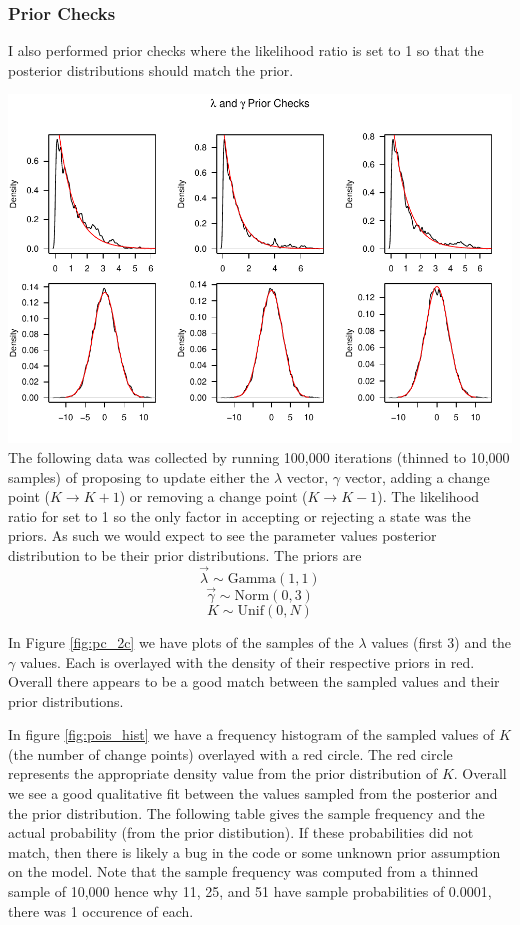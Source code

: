 \documentclass[11pt,a4paper]{article}
\numberwithin{equation}{section}
\begin{document}
\hypertarget{prior-checks-1}{%
\subsubsection{Prior Checks}\label{prior-checks-1}}

I also performed prior checks where the likelihood ratio is set to 1 so
that the posterior distributions should match the prior.

\includegraphics{thesis_draft_files/figure-latex/prior_checks_2c-1.pdf}
The following data was collected by running 100,000 iterations (thinned
to 10,000 samples) of proposing to update either the \(\lambda\) vector,
\(\gamma\) vector, adding a change point (\(K \rightarrow K + 1\)) or
removing a change point (\(K \rightarrow K - 1\)). The likelihood ratio
for set to 1 so the only factor in accepting or rejecting a state was
the priors. As such we would expect to see the parameter values
posterior distribution to be their prior distributions. The priors are
\[\vec\lambda \sim \text{Gamma}(1,1)\]
\[\vec\gamma \sim \text{Norm}(0,3)\] \[K \sim \text{Unif}(0,N)\]

In Figure \ref{fig:pc_2c} we have plots of the samples of the
\(\lambda\) values (first 3) and the \(\gamma\) values. Each is
overlayed with the density of their respective priors in red. Overall
there appears to be a good match between the sampled values and their
prior distributions.

In figure \ref{fig:pois_hist} we have a frequency histogram of the
sampled values of \(K\) (the number of change points) overlayed with a
red circle. The red circle represents the appropriate density value from
the prior distribution of \(K\). Overall we see a good qualitative fit
between the values sampled from the posterior and the prior
distribution. The following table gives the sample frequency and the
actual probability (from the prior distibution). If these probabilities
did not match, then there is likely a bug in the code or some unknown
prior assumption on the model. Note that the sample frequency was
computed from a thinned sample of 10,000 hence why 11, 25, and 51 have
sample probabilities of 0.0001, there was 1 occurence of each.
\end{document}
